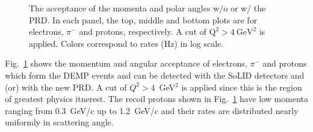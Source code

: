 \begin{figure}[!ht]
 \begin{center}
   \caption[The acceptance of the momenta and scattering angles for electrons,
     $\pi^{-}$ and protons]{\footnotesize{The acceptance of the momenta and
       polar angles w/o or w/ the PRD. In each panel, the top, middle and
       bottom plots are for electrons, $\pi^{-}$ and protons, respectively. A
       cut of $\mathrm{Q^{2}>4~GeV^{2}}$ is applied. Colors correspond to rates
       (Hz) in log scale.}}
  \label{p_theta}
  \end{center}
\end{figure}
Fig.~\ref{p_theta} shows the momentum and angular acceptance of electrons,
$\pi^{-}$ and protons which form the DEMP events and can be detected with the
SoLID detectors and (or) with the new PRD.  A cut of $Q^{2}>$4~GeV$^{2}$
is applied since this is the region of greatest physics itnerest.  The recoil
protons shown in Fig.~\ref{p_theta} have low momenta ranging from 0.3~GeV/c up
to 1.2~GeV/c and their rates are distributed nearly uniformly in scattering
angle.

